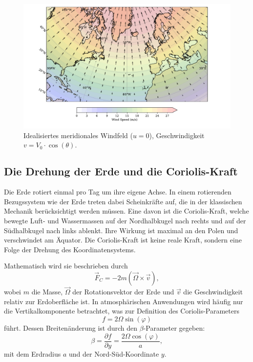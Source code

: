 \begin{figure}
	\centering
	\includegraphics[width=\textwidth, trim=1cm 0cm 2cm 0cm, clip]{papers/rossby/images/meridional_wind_plot.pdf}
	\caption{Idealisiertes meridionales Windfeld (\(u=0\)), Geschwindigkeit \(v = V_0 \cdot \cos(\theta)\).}
	\label{fig:meridional_wind}
\end{figure}

\subsection{Die Drehung der Erde und die Coriolis-Kraft}

Die Erde rotiert einmal pro Tag um ihre eigene Achse. In einem rotierenden
Bezugssystem wie der Erde treten dabei Scheinkräfte auf, die in der klassischen
Mechanik berücksichtigt werden müssen. Eine davon ist die {Coriolis-Kraft},
welche bewegte Luft- und Wassermassen auf der {Nordhalbkugel} nach rechts und
auf der {Südhalbkugel} nach links ablenkt. Ihre Wirkung ist maximal an den
Polen und verschwindet am Äquator. Die Coriolis-Kraft ist keine reale Kraft,
sondern eine Folge der Drehung des Koordinatensystems.

Mathematisch wird sie beschrieben durch
\begin{equation}
	\vec{F}_C = -2m(\vec{\Omega} \times \vec{v}),
	\label{rossby:eq:coriolis_force}
\end{equation}
wobei \(m\) die Masse, \(\vec{\Omega}\) der Rotationsvektor der Erde und \(\vec{v}\) die Geschwindigkeit relativ zur Erdoberfläche ist. In atmosphärischen Anwendungen wird häufig nur die Vertikalkomponente betrachtet, was zur Definition des {Coriolis-Parameters}
\begin{equation}
	f = 2\Omega \sin(\varphi)
	\label{rossby:eq:coriolis_parameter}
\end{equation}
führt. Dessen Breitenänderung ist durch den \(\beta\)-Parameter gegeben:
\begin{equation}
	\beta = \frac{\partial f}{\partial y} = \frac{2 \Omega \cos(\varphi)}{a},
	\label{rossby:eq:beta_parameter}
\end{equation}
mit dem Erdradius \(a\) und der Nord-Süd-Koordinate \(y\).

